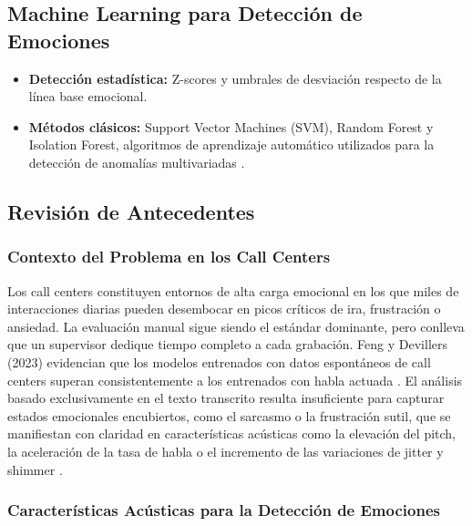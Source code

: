 \subsection{Machine Learning para Detección de Emociones}

\begin{itemize}
    \item \textbf{Detección estadística:} Z-scores y umbrales de desviación respecto
          de la línea base emocional.
    \item \textbf{Métodos clásicos:} Support Vector Machines (SVM), Random Forest y
          Isolation Forest, algoritmos de aprendizaje automático utilizados para la
          detección de anomalías multivariadas \cite{wagner2023, xu2023, nath2024}.
\end{itemize}

\subsection{Revisión de Antecedentes}

\subsubsection{Contexto del Problema en los Call Centers}

Los call centers constituyen entornos de alta carga emocional en los que miles de
interacciones diarias pueden desembocar en picos críticos de ira, frustración o
ansiedad. La evaluación manual sigue siendo el estándar dominante, pero conlleva que
un supervisor dedique tiempo completo a cada grabación. Feng y Devillers (2023)
evidencian que los modelos entrenados con datos espontáneos de call centers superan
consistentemente a los entrenados con habla actuada \cite{feng2023}. El análisis
basado exclusivamente en el texto transcrito resulta insuficiente para capturar
estados emocionales encubiertos, como el sarcasmo o la frustración sutil, que se
manifiestan con claridad en características acústicas como la elevación del pitch, la
aceleración de la tasa de habla o el incremento de las variaciones de jitter y
shimmer \cite{jha2022, lian2023}.

\subsubsection{Características Acústicas para la Detección de Emociones}

